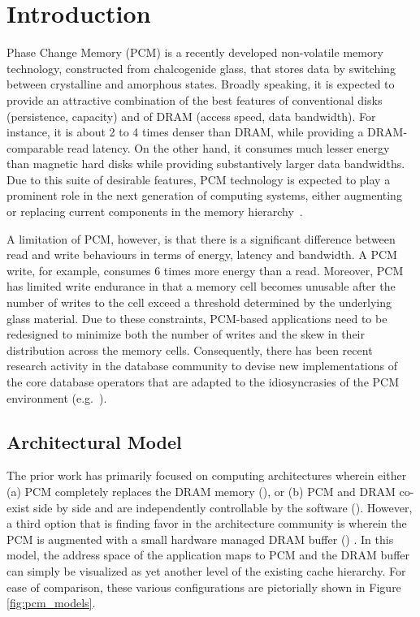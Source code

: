 \section{Introduction}
\label{sec:intro}
%
Phase Change Memory (PCM) is a recently developed non-volatile memory
technology, constructed from chalcogenide glass, that stores data by
switching between crystalline and amorphous states. Broadly speaking,
it is expected to provide an attractive combination of the best features
of conventional disks (persistence, capacity) and of DRAM (access speed,
data bandwidth). For instance, it is about 2 to 4 times denser than DRAM,
while providing a DRAM-comparable read latency.  On the other hand,
it consumes much lesser energy than magnetic hard disks while providing
substantively larger data bandwidths. Due to this suite of  desirable
features, PCM technology is expected to play a prominent role in the next
generation of computing systems, either augmenting or replacing current
components in the memory hierarchy~\cite{qureshi,zhou,lee}.

A limitation of PCM, however, is that there is a significant difference
between read and write behaviours in terms of energy, latency and
bandwidth. A PCM write, for example, consumes 6 times more energy than
a read. Moreover, PCM has limited write endurance in that a memory
cell becomes unusable after the number of writes to the cell exceed
a threshold determined by the underlying glass material.  Due to these
constraints, PCM-based applications need to be redesigned to minimize
both the number of writes and the skew in their distribution across the
memory cells.  Consequently, there has been recent research activity in
the database community to devise new implementations of the core database
operators that are adapted to the idiosyncrasies of the PCM environment
(e.g.~\cite{chen,viglas}).

\subsection*{Architectural Model}
The prior work has primarily focused on computing architectures wherein either
(a) PCM completely
replaces the DRAM memory (\modelPcmRam{}), or (b) PCM and DRAM co-exist side by side and
are independently controllable by the software (\modelExplicit{}).  However, a third option
that is finding favor in the architecture community is wherein the PCM is augmented with a
small hardware managed DRAM buffer (\model{}) \cite{qureshi}. In this model, the address
space of the application maps to PCM and the DRAM buffer can simply be
visualized as yet another level of the existing cache hierarchy.
For ease of comparison, these various configurations are pictorially
shown in Figure \ref{fig:pcm_models}.

